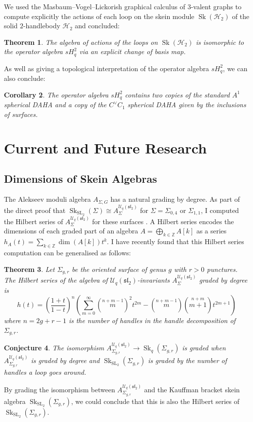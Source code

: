 \documentclass{article}
\newcommand{\Sk}{\operatorname{Sk}}
\newcommand{\SL}{\operatorname{SL}}
\newcommand{\slgroup}{\mathfrak{sl}}
\newtheorem{thm}{Theorem}
\newtheorem{cor}[thm]{Corollary}
\newtheorem{conj}[thm]{Conjecture}
\begin{document}
We used the Masbaum--Vogel--Lickorish graphical calculus of $3$-valent graphs \cite{MasbaumVogel94, Lickorish93} to compute explicitly the actions of each loop on the skein module $\Sk(\mathcal{H}_2)$ of the solid $2$-handlebody $\mathcal{H}_2$ and concluded: 

\begin{thm}
The algebra of actions of the loops on $\Sk(\mathcal{H}_2)$ is isomorphic to the operator algebra $sH^2_q$ via an explicit change of basis map. 
\end{thm}

As well as giving a topological interpretation of the operator algebra $sH^2_q$, we can also conclude:

\begin{cor}
The operator algebra $sH^2_q$ contains two copies of the standard $A^1$ spherical DAHA and a copy of the $C^{\vee}C_1$ spherical DAHA given by the inclusions of surfaces. 
\end{cor}

\section{Current and Future Research}

\subsection{Dimensions of Skein Algebras}

The Alekseev moduli algebra $A_{\Sigma, G}$ has a natural grading by degree. As part of the direct proof that $\Sk_{\SL_2}(\Sigma) \cong A_{\Sigma}^{\mathcal{U}_q(\slgroup_2)}$ for $\Sigma = \Sigma_{0,4}$ or $\Sigma_{1,1}$, I computed the Hilbert series of  $A_{\Sigma}^{\mathcal{U}_q(\slgroup_2)}$ for these surfaces \cite{C1}. A Hilbert series encodes the dimensions of each graded part of an algebra $A = \bigoplus_{k \in \mathbb{Z}} A[k]$ as a series $h_A(t) = \sum_{k \in \mathbb{Z}} \dim(A[k]) t^k$.
I have recently found that this Hilbert series computation can be generalised as follows:
\begin{thm}
Let $\Sigma_{g,r}$ be the oriented surface of genus $g$ with $r>0$ punctures. The Hilbert series of the algebra of $\mathcal{U}_q(\slgroup_2)$-invariants $A_{\Sigma}^{\mathcal{U}_q(\slgroup_2)}$ graded by degree is 
\[
h(t) = \left(\frac{1+t}{1-t}\right)^n \left(\sum_{m=0}^{\infty} \left(\stackrel{n+m-1}{m} \right)^2 t^{2m} - \left(\stackrel{n+m-1}{m}\right) \left(\stackrel{n+m}{m+1}\right) t^{2m+1}\right)
\]
where $n = 2g+r-1$ is the number of handles in the handle decomposition of $\Sigma_{g,r}$. 
\end{thm}
\begin{conj}
The isomorphism $A_{\Sigma_{g,r}}^{\mathcal{U}_q(\slgroup_2)} \to \Sk_q(\Sigma_{g,r})$ is graded when $A_{\Sigma_{g,r}}^{\mathcal{U}_q(\slgroup_2)}$ is graded by degree and $\Sk_{\SL_2}(\Sigma_{g,r})$ is graded by the number of handles a loop goes around. 
\end{conj}
By grading the isomorphism between $A_{\Sigma_{g,r}}^{\mathcal{U}_q(\slgroup_2)}$ and the Kauffman bracket skein algebra $\Sk_{\SL_2}(\Sigma_{g,r})$, we could conclude that this is also the Hilbert series of $\Sk_{\SL_2}(\Sigma_{g,r})$. 
\end{document}
